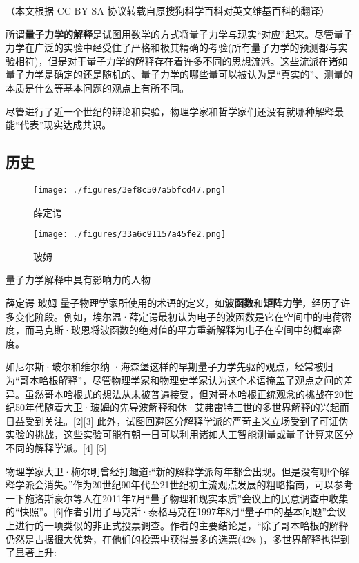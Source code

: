 
（本文根据 CC-BY-SA 协议转载自原搜狗科学百科对英文维基百科的翻译）

所谓\textbf{量子力学的解释}是试图用数学的方式将量子力学与现实“对应”起来。尽管量子力学在广泛的实验中经受住了严格和极其精确的考验(所有量子力学的预测都与实验相符)，但是对于量子力学的解释存在着许多不同的思想流派。这些流派在诸如量子力学是确定的还是随机的、量子力学的哪些量可以被认为是“真实的”、测量的本质是什么等基本问题的观点上有所不同。

尽管进行了近一个世纪的辩论和实验，物理学家和哲学家们还没有就哪种解释最能“代表”现实达成共识。

\subsection{历史}

\begin{figure}[ht]
\centering
\texttt{[image: ./figures/3ef8c507a5bfcd47.png]}
\caption{薛定谔} \label{fig_QMinet_1}
\end{figure}

\begin{figure}[ht]
\centering
\texttt{[image: ./figures/33a6c91157a45fe2.png]}
\caption{玻姆} \label{fig_QMinet_2}
\end{figure}

量子力学解释中具有影响力的人物

薛定谔
玻姆
量子物理学家所使用的术语的定义，如\textbf{波函数}和\textbf{矩阵力学}，经历了许多变化阶段。例如，埃尔温·薛定谔最初认为电子的波函数是它在空间中的电荷密度，而马克斯·玻恩将波函数的绝对值的平方重新解释为电子在空间中的概率密度。

如尼尔斯·玻尔和维尔纳 ·海森堡这样的早期量子力学先驱的观点，经常被归为“哥本哈根解释”，尽管物理学家和物理史学家认为这个术语掩盖了观点之间的差异。虽然哥本哈根式的想法从未被普遍接受，但对哥本哈根正统观念的挑战在20世纪50年代随着大卫·玻姆的先导波解释和休·艾弗雷特三世的多世界解释的兴起而日益受到关注。[2][3] 此外，试图回避区分解释学派的严苛主义立场受到了可证伪实验的挑战，这些实验可能有朝一日可以利用诸如人工智能测量或量子计算来区分不同的解释学派。[4] [5]

物理学家大卫·梅尔明曾经打趣道:“新的解释学派每年都会出现。但是没有哪个解释学派会消失。”作为20世纪90年代至21世纪初主流观点发展的粗略指南，可以参考一下施洛斯豪尔等人在2011年7月“量子物理和现实本质”会议上的民意调查中收集的“快照”。[6]作者引用了马克斯·泰格马克在1997年8月“量子中的基本问题”会议上进行的一项类似的非正式投票调查。作者的主要结论是，“除了哥本哈根的解释仍然是占据很大优势，在他们的投票中获得最多的选票(42\verb|%| )，多世界解释也得到了显著上升:

